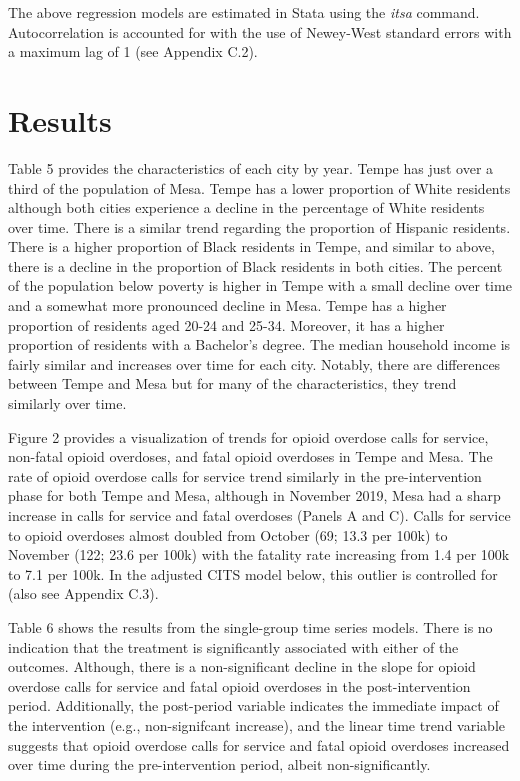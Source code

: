 The above regression models are estimated in Stata \parencite{statacorp_stata_2023} using the \textit{itsa} command. Autocorrelation is accounted for with the use of Newey-West standard errors with a maximum lag of 1 (see Appendix C.2).

\section{\centering Results}
Table 5 provides the characteristics of each city by year. Tempe has just over a third of the population of Mesa. Tempe has a lower proportion of White residents although both cities experience a decline in the percentage of White residents over time. There is a similar trend regarding the proportion of Hispanic residents. There is a higher proportion of Black residents in Tempe, and similar to above, there is a decline in the proportion of Black residents in both cities. The percent of the population below poverty is higher in Tempe with a small decline over time and a somewhat more pronounced decline in Mesa. Tempe has a higher proportion of residents aged 20-24 and 25-34. Moreover, it has a higher proportion of residents with a Bachelor's degree. The median household income is fairly similar and increases over time for each city. Notably, there are differences between Tempe and Mesa but for many of the characteristics, they trend similarly over time. 

Figure 2 provides a visualization of trends for opioid overdose calls for service, non-fatal opioid overdoses, and fatal opioid overdoses in Tempe and Mesa. The rate of opioid overdose calls for service trend similarly in the pre-intervention phase for both Tempe and Mesa, although in November 2019, Mesa had a sharp increase in calls for service and fatal overdoses (Panels A and C). Calls for service to opioid overdoses almost doubled from October (69; 13.3 per 100k) to November (122; 23.6 per 100k) with the fatality rate increasing from 1.4 per 100k to 7.1 per 100k. In the adjusted CITS model below, this outlier is controlled for (also see Appendix C.3).

Table 6 shows the results from the single-group time series models. There is no indication that the treatment is significantly associated with either of the outcomes. Although, there is a non-significant decline in the slope for opioid overdose calls for service and fatal opioid overdoses in the post-intervention period. Additionally, the post-period variable indicates the immediate impact of the intervention (e.g., non-signifcant increase), and the linear time trend variable suggests that opioid overdose calls for service and fatal opioid overdoses increased over time during the pre-intervention period, albeit non-significantly. 

